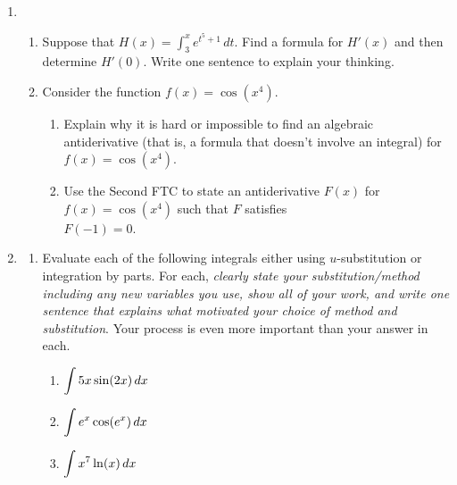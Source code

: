 \documentclass[11 pt]{article}
\newcommand{\ds}{\ensuremath{\displaystyle}}
\newcommand{\tr}{\vspace{0.5in}}
\newcommand{\lr}{\vspace{1.0in}}
\newcommand{\mr}{\vspace{2.0in}}
\newcommand{\be}{\begin{enumerate}}
\newcommand{\ee}{\end{enumerate}}
\begin{document}
\begin{enumerate}


	\item[3.] \ 
	\be
		\item Suppose that $H(x) = \int_3^x e^{t^5+1} \, dt$.  Find a formula for $H'(x)$ and then determine $H'(0)$.  Write one sentence to explain your thinking.
		
		\lr \tr
		
		\item Consider the function $f(x) = \cos(x^4)$.
		
		\be
			\item Explain why it is hard or impossible to find an algebraic antiderivative (that is, a formula that doesn't involve an integral) for $f(x) = \cos(x^4)$.
			
			\lr \lr
			
			\item Use the Second FTC to state an antiderivative $F(x)$ for $f(x) = \cos(x^4)$ such that $F$ satisfies \\ $F(-1) = 0$.
		\ee	
	\ee
		

\pagebreak

\item[4.] 

	\be
		\item Evaluate each of the following integrals either using $u$-substitution or integration by parts.  For each, \emph{clearly state your substitution/method including any new variables you use, show all of your work, and write one sentence that explains what motivated your choice of method and substitution}.  Your process is even more important than your answer in each.

			\be
				\item $\ds \int 5x \sin(2x) \, dx$
			
				\mr
			
				\item $\ds \int e^x \cos(e^x) \, dx$
			
				\mr

				\item $\ds \int x^7 \ln(x) \, dx$

			\ee

	\ee
	
	\pagebreak


\end{enumerate}
\end{document}
